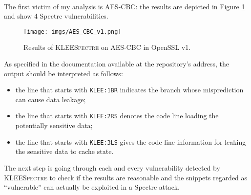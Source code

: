 \documentclass[target=mst,aauheader=aics]{thud}
\theoremstyle{definition}
\begin{document}
	\paragraph{}The first victim of my analysis is AES-CBC: the results are depicted in Figure \ref{fig:result_cbc_v1} and show 4 Spectre vulnerabilities. 
	\begin{figure}
		\centering
		\texttt{[image: imgs/AES\_CBC\_v1.png]}
		\captionsetup{width=.9\linewidth}
		\caption{Results of \textsc{KLEESpectre} on AES-CBC in OpenSSL v1.}
		\label{fig:result_cbc_v1}
	\end{figure}
	As specified in the documentation available at the repository's address, the output should be interpreted as follows:
	\begin{itemize}
		\item the line that starts with \texttt{KLEE:1BR} indicates the branch whose misprediction can cause data leakage;
		\item the line that starts with \texttt{KLEE:2RS} denotes the code line loading the potentially sensitive data;
		\item the line that starts with \texttt{KLEE:3LS} gives the code line information for leaking the sensitive data to cache state.
	\end{itemize}
	The next step is going through each and every vulnerability detected by \textsc{KLEESpectre} to check if the results are reasonable and the snippets regarded as ``vulnerable'' can actually be exploited in a Spectre attack. 
	
\end{document}
